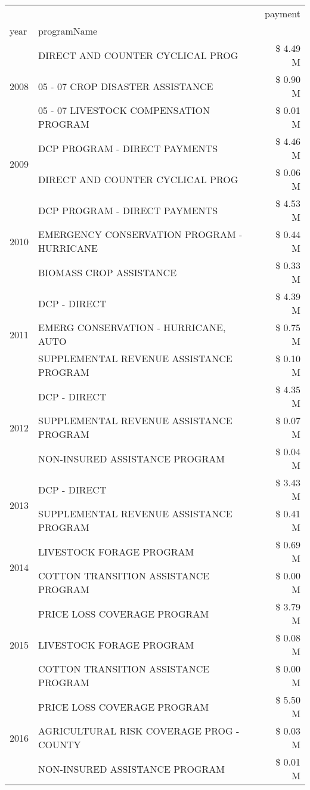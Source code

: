 \begin{tabular}{llr}
\toprule
 &  & payment \\
year & programName &  \\
\midrule
\multirow[t]{3}{*}{2008} & DIRECT AND COUNTER CYCLICAL PROG & \$ 4.49 M \\
 & 05 - 07 CROP DISASTER ASSISTANCE & \$ 0.90 M \\
 & 05 - 07 LIVESTOCK COMPENSATION PROGRAM & \$ 0.01 M \\
\cline{1-3}
\multirow[t]{2}{*}{2009} & DCP PROGRAM - DIRECT PAYMENTS & \$ 4.46 M \\
 & DIRECT AND COUNTER CYCLICAL PROG & \$ 0.06 M \\
\cline{1-3}
\multirow[t]{3}{*}{2010} & DCP PROGRAM - DIRECT PAYMENTS & \$ 4.53 M \\
 & EMERGENCY CONSERVATION PROGRAM - HURRICANE & \$ 0.44 M \\
 & BIOMASS CROP ASSISTANCE & \$ 0.33 M \\
\cline{1-3}
\multirow[t]{3}{*}{2011} & DCP - DIRECT & \$ 4.39 M \\
 & EMERG CONSERVATION - HURRICANE, AUTO & \$ 0.75 M \\
 & SUPPLEMENTAL REVENUE ASSISTANCE PROGRAM & \$ 0.10 M \\
\cline{1-3}
\multirow[t]{3}{*}{2012} & DCP - DIRECT & \$ 4.35 M \\
 & SUPPLEMENTAL REVENUE ASSISTANCE PROGRAM & \$ 0.07 M \\
 & NON-INSURED ASSISTANCE PROGRAM & \$ 0.04 M \\
\cline{1-3}
\multirow[t]{2}{*}{2013} & DCP - DIRECT & \$ 3.43 M \\
 & SUPPLEMENTAL REVENUE ASSISTANCE PROGRAM & \$ 0.41 M \\
\cline{1-3}
\multirow[t]{2}{*}{2014} & LIVESTOCK FORAGE PROGRAM & \$ 0.69 M \\
 & COTTON TRANSITION ASSISTANCE PROGRAM & \$ 0.00 M \\
\cline{1-3}
\multirow[t]{3}{*}{2015} & PRICE LOSS COVERAGE PROGRAM & \$ 3.79 M \\
 & LIVESTOCK FORAGE PROGRAM & \$ 0.08 M \\
 & COTTON TRANSITION ASSISTANCE PROGRAM & \$ 0.00 M \\
\cline{1-3}
\multirow[t]{3}{*}{2016} & PRICE LOSS COVERAGE PROGRAM & \$ 5.50 M \\
 & AGRICULTURAL RISK COVERAGE PROG - COUNTY & \$ 0.03 M \\
 & NON-INSURED ASSISTANCE PROGRAM & \$ 0.01 M \\

\end{tabular}
